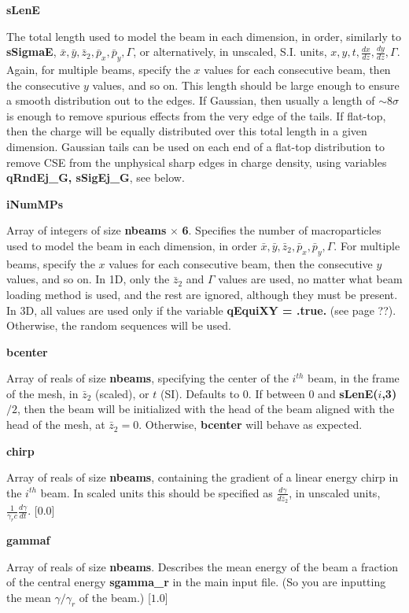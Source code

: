 \documentclass[12pt]{article}%
\begin{document}
{\bf sLenE}

The total length used to model the beam in each dimension, in order, similarly to {\bf sSigmaE}, $\bar{x}, \bar{y}, \bar{z}_2, \bar{p}_x, \bar{p}_y, \Gamma$, or alternatively, in unscaled, S.I. units, $x,y,t,\frac{dx}{dz}, \frac{dy}{dz}, \Gamma$. Again, for multiple beams, specify the $x$ values for each consecutive beam, then the consecutive $y$ values, and so on. This length should be large enough to ensure a smooth distribution out to the edges. If Gaussian, then usually a length of $\sim 8\sigma$ is enough to remove spurious effects from the very edge of the tails. If flat-top, then the charge will be equally distributed over this total length in a given dimension. Gaussian tails can be used on each end of a flat-top distribution to remove CSE from the unphysical sharp edges in charge density, using variables {\bf qRndEj\_G, sSigEj\_G}, see below.

{\bf iNumMPs}

Array of integers of size {\bf nbeams} $\times$ {\bf 6}. Specifies the number of macroparticles used to model the beam in each dimension, in order $\bar{x}, \bar{y}, \bar{z}_2, \bar{p}_x, \bar{p}_y, \Gamma$. For multiple beams, specify the $x$ values for each consecutive beam, then the consecutive $y$ values, and so on. In 1D, only the $\bar{z}_2$ and $\Gamma$ values are used, no matter what beam loading method is used, and the rest are ignored, although they must be present. In 3D, all values are used only if the variable {\bf qEquiXY = .true.} (see page ??). Otherwise, the random sequences will be used.

{\bf bcenter}

Array of reals of size {\bf nbeams}, specifying the center of the $i^{th}$ beam, in the frame of the mesh, in $\bar{z}_2$ (scaled), or $t$ (SI). Defaults to 0. If between $0$ and {\bf sLenE($i$,3)} $/ 2$, then the beam will be initialized with the head of the beam aligned with the head of the mesh, at $\bar{z}_2 = 0$. Otherwise, {\bf bcenter} will behave as expected.


{\bf chirp}

Array of reals of size {\bf nbeams}, containing the gradient of a linear energy chirp in the $i^{th}$ beam. In scaled units this should be specified as $\frac{d\gamma}{d\bar{z}_2}$, in unscaled units, $\frac{1}{\gamma_r c} \frac{d\gamma}{dt}$. [0.0]


{\bf gammaf}

Array of reals of size {\bf nbeams}. Describes the mean energy of the beam a fraction of the central energy {\bf sgamma\_r} in the main input file. (So you are inputting the mean $\gamma / \gamma_r$ of the beam.) [$1.0$]
\end{document}
